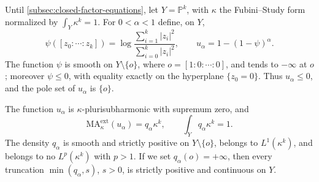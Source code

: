 Until \cref{subsec:closed-factor-equations}, let $Y=\mathbb P^k$, with $\kappa$ the Fubini--Study form normalized by $\int_Y\kappa^k=1$. For $0<\alpha<1$ define, on $Y$,
\[
 \psi([z_0:\cdots:z_k])=\log\frac{\sum_{i=1}^k|z_i|^2}{\sum_{i=0}^k|z_i|^2},
 \qquad u_\alpha=1-(1-\psi)^\alpha.
\]
The function $\psi$ is smooth on $Y\setminus\{o\}$, where $o=[1:0:\cdots:0]$, and tends to $-\infty$ at $o$; moreover $\psi\leq0$, with equality exactly on the hyperplane $\{z_0=0\}$. Thus $u_\alpha\leq0$, and the pole set of $u_\alpha$ is $\{o\}$.

\begin{lemma}\label{lem:projective-sublogarithmic-density}
The function $u_\alpha$ is $\kappa$-plurisubharmonic with supremum zero, and
\[
 \mathrm{MA}^{\mathrm{ext}}_\kappa(u_\alpha)=q_\alpha\kappa^k,
 \qquad \int_Yq_\alpha\kappa^k=1.
\]
The density $q_\alpha$ is smooth and strictly positive on $Y\setminus\{o\}$, belongs to $L^1(\kappa^k)$, and belongs to no $L^p(\kappa^k)$ with $p>1$. If we set $q_\alpha(o)=+\infty$, then every truncation $\min(q_\alpha,s)$, $s>0$, is strictly positive and continuous on $Y$.
\end{lemma}
